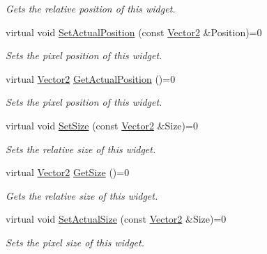 \begin{DoxyCompactItemize}
\begin{DoxyCompactList}\small\item\em Gets the relative position of this widget. \item\end{DoxyCompactList}\item 
virtual void \hyperlink{classphys_1_1UI_1_1Widget_a77727351d98b10f1f4eb45048cb882e3}{SetActualPosition} (const \hyperlink{classphys_1_1Vector2}{Vector2} \&Position)=0
\begin{DoxyCompactList}\small\item\em Sets the pixel position of this widget. \item\end{DoxyCompactList}\item 
virtual \hyperlink{classphys_1_1Vector2}{Vector2} \hyperlink{classphys_1_1UI_1_1Widget_a0a29fecff7f56d7909f65fd63b0990e7}{GetActualPosition} ()=0
\begin{DoxyCompactList}\small\item\em Sets the pixel position of this widget. \item\end{DoxyCompactList}\item 
virtual void \hyperlink{classphys_1_1UI_1_1Widget_a00f73c12583d25a75c089f944075b24d}{SetSize} (const \hyperlink{classphys_1_1Vector2}{Vector2} \&Size)=0
\begin{DoxyCompactList}\small\item\em Sets the relative size of this widget. \item\end{DoxyCompactList}\item 
virtual \hyperlink{classphys_1_1Vector2}{Vector2} \hyperlink{classphys_1_1UI_1_1Widget_a07039c19e57de314147ce066417da0a2}{GetSize} ()=0
\begin{DoxyCompactList}\small\item\em Gets the relative size of this widget. \item\end{DoxyCompactList}\item 
virtual void \hyperlink{classphys_1_1UI_1_1Widget_acda63a62fa158d5fe00c86f50e5c120d}{SetActualSize} (const \hyperlink{classphys_1_1Vector2}{Vector2} \&Size)=0
\begin{DoxyCompactList}\small\item\em Sets the pixel size of this widget. \item\end{DoxyCompactList}\item 

\end{DoxyCompactItemize}
